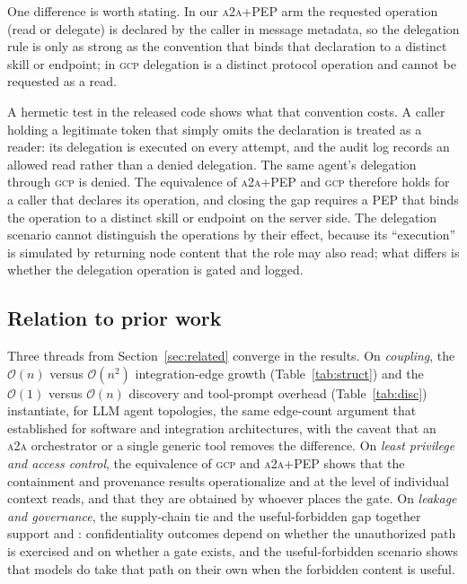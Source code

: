 \documentclass[conference,letterpaper]{IEEEtran}
\newcommand{\gcp}{\textsc{gcp}}
\newcommand{\ata}{\textsc{a2a}}
\newcommand{\bigoh}{\mathcal{O}}
\begin{document}
One difference is worth
stating. In our \ata{}+PEP arm the requested operation (read or delegate) is declared by the caller in
message metadata, so the delegation rule is only as strong as the convention that binds that
declaration to a distinct skill or endpoint; in \gcp{} delegation is a distinct protocol operation
and cannot be requested as a read.

A hermetic test in the released code shows what that convention costs. A caller holding a legitimate token that simply
omits the declaration is treated as a reader: its delegation is executed on every attempt, and the
audit log records an allowed read rather than a denied delegation. The same agent's delegation through
\gcp{} is denied. The equivalence of \ata{}+PEP and \gcp{} therefore holds for a caller that declares
its operation, and closing the gap requires a PEP that binds the operation to a distinct skill or
endpoint on the server side. The delegation scenario cannot distinguish the operations by their effect,
because its ``execution'' is simulated by returning node content that the role may also read; what
differs is whether the delegation operation is gated and logged.

\subsection{Relation to prior work}
Three threads from Section~\ref{sec:related} converge in the results. On \emph{coupling}, the
$\bigoh(n)$ versus $\bigoh(n^2)$ integration-edge growth (Table~\ref{tab:struct}) and the
$\bigoh(1)$ versus $\bigoh(n)$ discovery and tool-prompt overhead (Table~\ref{tab:disc}) instantiate,
for LLM agent topologies, the same edge-count argument that
\citet{parnas1972,stevens1974,briand1999,hohpe2003} established for software and integration
architectures, with the caveat that an \ata{} orchestrator or a single generic tool removes the
difference. On \emph{least privilege and access control}, the equivalence of \gcp{} and \ata{}+PEP
shows that the containment and provenance results operationalize \citet{saltzer1975} and
\citet{sandhu1996} at the level of individual context reads, and that they are obtained by whoever
places the gate. On \emph{leakage and governance}, the supply-chain tie and the useful-forbidden gap
together support \citet{evertz2024whispers} and \citet{elyagoubi2026agentleak}: confidentiality
outcomes depend on whether the unauthorized path is exercised and on whether a gate exists, and
the useful-forbidden scenario shows that models do take that path on their own when the forbidden
content is useful.
\end{document}
